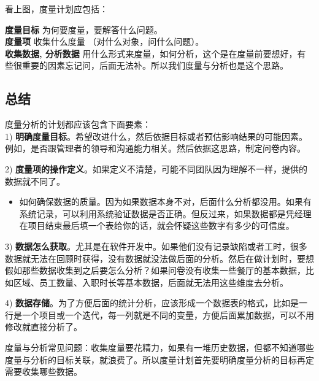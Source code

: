 看上图，度量计划应包括：

\textbf{度量目标} 为何要度量，要解答什么问题。\\
\textbf{度量项} 收集什么度量 （对什么对象，问什么问题）。\\
\textbf{收集数据, 分析数据}
用什么形式来度量，如何分析，这个是在度量前要想好，有些很重要的因素忘记问，后面无法补。所以我们度量与分析也是这个思路。

\hypertarget{ux603bux7ed3}{%
\subsection{总结}\label{ux603bux7ed3}}

度量分析的计划都应该包含下面要素：\\
1)
\textbf{明确度量目标}。希望改进什么，然后依据目标或者预估影响结果的可能因素。例如，是否跟管理者的领导和沟通能力相关。然后依据这思路，制定问卷内容。

2)
\textbf{度量项的操作定义}。如果定义不清楚，可能不同团队因为理解不一样，提供的数据就不同了。

\begin{itemize}
\tightlist
\item
  如何确保数据的质量。因为如果数据本身不对，后面什么分析都没用。如果有系统记录，可以利用系统验证数据是否正确。但反过来，如果数据都是凭经理在项目结束最后填一个表给你的话，就会怀疑这些数字有多少的可信度。
\end{itemize}

3)
\textbf{数据怎么获取}。尤其是在软件开发中。如果他们没有记录缺陷或者工时，很多数据就无法在回顾时获得，没有数据就没法做后面的分析。然后在做计划时，要想假如那些数据收集到之后要怎么分析？如果问卷没有收集一些餐厅的基本数据，比如区域、员工数量、入职时长等基本数据，后面就无法用这些维度去分析。

4)
\textbf{数据存储}。为了方便后面的统计分析，应该形成一个数据表的格式，比如是一行是一个项目或一个迭代，每一列就是不同的变量，方便后面累加数据，可以不用修改就直接分析了。

度量与分析常见问题：收集度量要花精力，如果有一堆历史数据，但都不知道哪些度量与分析的目标关联，就浪费了。所以度量计划首先要明确度量分析的目标再定需要收集哪些数据。



